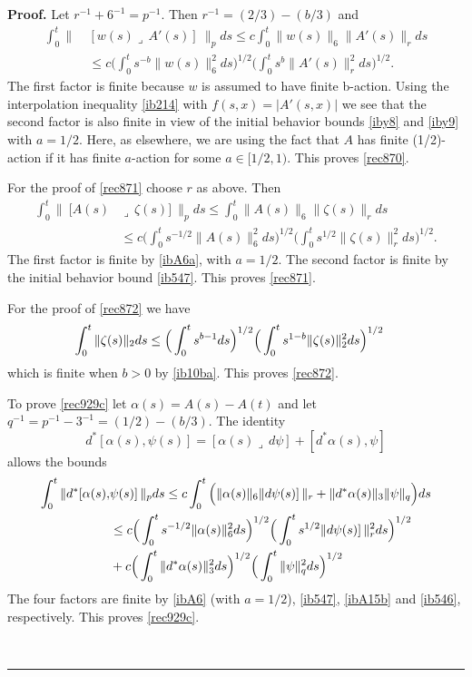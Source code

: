 \documentclass[12pt]{article}
\newenvironment{proof}[1][Proof]{\textbf{#1.} }{\ \rule{0.5em}{0.5em}}
\def \({\Big(}
\def \){\Big)}
\def \beq{\begin{equation}}
\def \eeq{\end{equation}}
\def \eref{\eqref}
\def \lrc{\lrcorner\,}
\numberwithin{equation}{section}
\begin{document}
        \begin{proof} Let $r^{-1} + 6^{-1} = p^{-1}$. Then $r^{-1} = (2/3) - (b/3)$ and 
\begin{align*}
 \int_0^t \|\  &[w(s)\lrc A'(s)]\ \|_p  ds \le c \int_0^t  \|w(s)\|_6 \| A'(s)\|_r ds \\
 &\le c \Big(\int_0^t s^{-b} \|w(s)\|_6^2 ds \Big)^{1/2} \Big(\int_0^t s^b \|A'(s)\|_r^2 ds \Big)^{1/2}.
 \end{align*}
 The first factor is finite because $w$ is assumed to have finite b-action. 
Using the interpolation inequality \eref{ib214} with $f(s,x) = |A'(s, x)|$  we see that
 the second factor is also  finite in view of the initial   behavior bounds  
\eref{iby8} and \eref{iby9} with $a = 1/2$. Here, as elsewhere, we are using the fact that $A$ has
finite (1/2)-action if it has finite $a$-action for some $a \in [1/2, 1)$. This proves \eref{rec870}.

      For the proof of \eref{rec871} choose $r$ as above. Then
      \begin{align*}
 \int_0^t \|\ [A(s)&\lrc \zeta(s)]\ \|_p ds \le \int_0^t \|A(s)\|_6 \|\zeta(s)\|_r ds \\
 &\le c \(\int_0^t s^{-1/2}\|A(s)\|_6^2 ds \)^{1/2} \(\int_0^t s^{1/2} \| \zeta(s) \|_r^2 ds \)^{1/2}.
\end{align*}
The first factor  is finite by \eref{ibA6a}, with $a = 1/2$.
The second factor is finite by the initial behavior bound  \eref{ib547}. This proves \eref{rec871}.

 
 For the proof of  \eref{rec872} we have 
  \begin{align}
   \int_0^t \|\zeta(s)\|_2 ds &\le \Big(\int_0^ts^{b-1} ds \Big)^{1/2}   \notag
   \Big(\int_0^t s^{1-b} \|\zeta(s)\|_2^2ds\)^{1/2}
   \end{align}
   which is finite when $b >0$ by \eref{ib10ba}. This proves \eref{rec872}.
  

To prove \eref{rec929c}  let $\alpha(s) = A(s) -A(t)$ and let $q^{-1} =p^{-1} - 3^{-1} =(1/2) - (b/3)$.
The identity  
\beq
d^*[\alpha(s), \psi(s)] = [\alpha(s)\lrc d\psi] + [d^* \alpha(s), \psi]  \label{rec931o}
\eeq
   allows the bounds
\begin{align}
\int_0^t \|d^*[\alpha(s), &\psi(s)]\, \|_p ds \le c\int_0^t\( \|\alpha(s)\|_6 \|d \psi(s)]\, \|_r  
+\|d^* \alpha(s)\|_3   \| \psi\|_q\)ds  \notag \\
&\le c \(\int_0^t  s^{-1/2}\|\alpha(s)\|_6^2 ds\)^{1/2} \(\int_0^t s^{1/2} \|d \psi(s)]\, \|_r^2 ds \)^{1/2} \notag\\
&+ c\(\int_0^t  \|d^* \alpha(s)\|_3^2ds\)^{1/2}   \(\int_0^t  \| \psi\|_q^2ds\)^{1/2}    \label{rec933}
\end{align}
The four factors are finite by \eref{ibA6} (with $a = 1/2$), \eref{ib547}, \eref{ibA15b}
 and \eref{ib546}, respectively. This proves \eref{rec929c}.
   

\end{proof}
\end{document}
